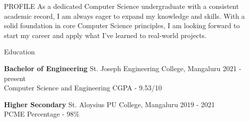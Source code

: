 \documentclass{resume} %
\begin{document}
\begin{rSection}{PROFILE}
    {
        As a dedicated Computer Science undergraduate
        with a consistent
        academic record, I am always eager to expand my knowledge
        and skills. With a solid foundation in core Computer Science
        principles, I am looking forward to start my career and
        apply what I've learned to real-world projects.
    }

\end{rSection}

\begin{rSection}{Education}

    {\bf Bachelor of Engineering} \textbar{} St. Joseph Engineering College, Mangaluru \hfill {2021 - present}\\
    Computer Science and Engineering \textbar{} CGPA - 9.53/10

    {\bf Higher Secondary} \textbar{} St. Aloysius PU College, Mangaluru \hfill {2019 - 2021}\\
    PCME \textbar{} Percentage - 98\%



\end{rSection}
\end{document}
